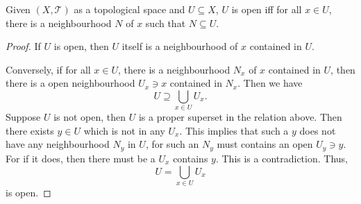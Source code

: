 \begin{theorem}
	\label{prop: alt-def of open sets by neighbourhoods}
	Given $(X, \mathcal T)$ as a topological space and $U \subseteq X$, $U$ is open iff for all $x \in U$, there is a neighbourhood $N$ of $x$ such that $N \subseteq U$.
	
	\begin{proof}
		If $U$ is open, then $U$ itself is a neighbourhood of $x$ contained in $U$.
		
		Conversely, if for all $x \in U$, there is a neighbourhood $N_x$ of $x$ contained in $U$, then there is a open neighbourhood $U_x \ni x$ contained in $N_x$. Then we have
		$$
		U \supseteq \bigcup_{x \in U} U_x.
		$$
		Suppose $U$ is not open, then $U$ is a proper superset in the relation above. Then there exists $y \in U$ which is not in any $U_x$. This implies that such a $y$ does not have any neighbourhood $N_y$ in $U$, for such an $N_y$ must contains an open $U_y \ni y$. For if it does, then there must be a $U_x$ contains $y$. This is a contradiction. Thus,
		$$
		U = \bigcup_{x \in U} U_x
		$$
		is open.
	\end{proof}
\end{theorem}
